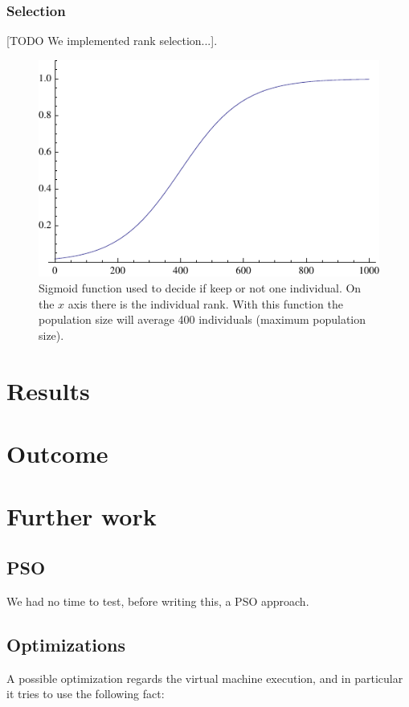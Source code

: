 \documentclass{report}
\begin{document}
\subsection{Selection}

[TODO We implemented rank selection...].

\begin{figure}[h]\centering
\includegraphics{figures/decision-function.pdf}
\caption{Sigmoid function used to decide if keep or not one individual. On the $x$ axis there is the individual rank. With this function the population size will average 400 individuals (maximum population size).}
\end{figure}




\chapter{Results}
\label{chap:results}


\chapter{Outcome}
\label{chap:outcome}


\chapter{Further work}
\label{chap:fwork}

\section{PSO}
We had no time to test, before writing this, a PSO approach.

\section{Optimizations}
A possible optimization regards the virtual machine execution, and in particular it tries to use the following fact:
\end{document}
